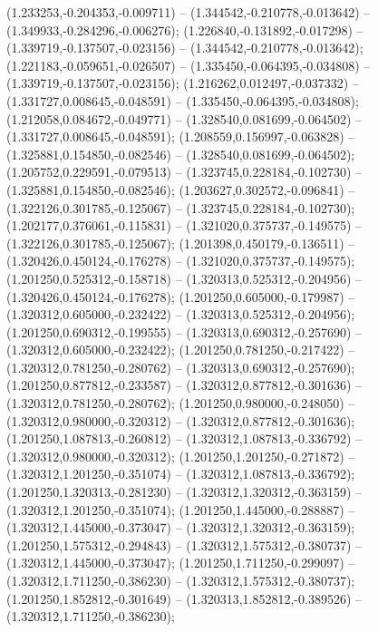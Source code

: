  (1.233253,-0.204353,-0.009711) -- (1.344542,-0.210778,-0.013642) -- (1.349933,-0.284296,-0.006276);
 (1.226840,-0.131892,-0.017298) -- (1.339719,-0.137507,-0.023156) -- (1.344542,-0.210778,-0.013642);
 (1.221183,-0.059651,-0.026507) -- (1.335450,-0.064395,-0.034808) -- (1.339719,-0.137507,-0.023156);
 (1.216262,0.012497,-0.037332) -- (1.331727,0.008645,-0.048591) -- (1.335450,-0.064395,-0.034808);
 (1.212058,0.084672,-0.049771) -- (1.328540,0.081699,-0.064502) -- (1.331727,0.008645,-0.048591);
 (1.208559,0.156997,-0.063828) -- (1.325881,0.154850,-0.082546) -- (1.328540,0.081699,-0.064502);
 (1.205752,0.229591,-0.079513) -- (1.323745,0.228184,-0.102730) -- (1.325881,0.154850,-0.082546);
 (1.203627,0.302572,-0.096841) -- (1.322126,0.301785,-0.125067) -- (1.323745,0.228184,-0.102730);
 (1.202177,0.376061,-0.115831) -- (1.321020,0.375737,-0.149575) -- (1.322126,0.301785,-0.125067);
 (1.201398,0.450179,-0.136511) -- (1.320426,0.450124,-0.176278) -- (1.321020,0.375737,-0.149575);
 (1.201250,0.525312,-0.158718) -- (1.320313,0.525312,-0.204956) -- (1.320426,0.450124,-0.176278);
 (1.201250,0.605000,-0.179987) -- (1.320312,0.605000,-0.232422) -- (1.320313,0.525312,-0.204956);
 (1.201250,0.690312,-0.199555) -- (1.320313,0.690312,-0.257690) -- (1.320312,0.605000,-0.232422);
 (1.201250,0.781250,-0.217422) -- (1.320312,0.781250,-0.280762) -- (1.320313,0.690312,-0.257690);
 (1.201250,0.877812,-0.233587) -- (1.320312,0.877812,-0.301636) -- (1.320312,0.781250,-0.280762);
 (1.201250,0.980000,-0.248050) -- (1.320312,0.980000,-0.320312) -- (1.320312,0.877812,-0.301636);
 (1.201250,1.087813,-0.260812) -- (1.320312,1.087813,-0.336792) -- (1.320312,0.980000,-0.320312);
 (1.201250,1.201250,-0.271872) -- (1.320312,1.201250,-0.351074) -- (1.320312,1.087813,-0.336792);
 (1.201250,1.320313,-0.281230) -- (1.320312,1.320312,-0.363159) -- (1.320312,1.201250,-0.351074);
 (1.201250,1.445000,-0.288887) -- (1.320312,1.445000,-0.373047) -- (1.320312,1.320312,-0.363159);
 (1.201250,1.575312,-0.294843) -- (1.320312,1.575312,-0.380737) -- (1.320312,1.445000,-0.373047);
 (1.201250,1.711250,-0.299097) -- (1.320312,1.711250,-0.386230) -- (1.320312,1.575312,-0.380737);
 (1.201250,1.852812,-0.301649) -- (1.320313,1.852812,-0.389526) -- (1.320312,1.711250,-0.386230);
